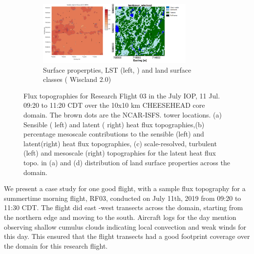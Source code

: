 \documentclass[draft]{agujournal2019}
\begin{document}
\begin{figure}[hbtp]
\begin{subfigure}{\textwidth}
     \end{subfigure}
     \begin{subfigure}{\textwidth}
         \includegraphics[width=0.85\textwidth]{topo_LST_landcover.png}
         \caption{Surface properpties, LST (left, \cite{desai_multisensor_2021}) and land surface classes ( Wiscland 2.0) }
         \label{fig:topo_LST_land}
     \end{subfigure}
        \caption{Flux topographies for Research Flight 03 in the July IOP, 11 Jul. 09:20 to 11:20 CDT over the 10x10 km CHEESEHEAD core domain. The brown dots are the NCAR-ISFS. tower locations. (a) Sensible ( left) and latent ( right) heat flux topographies,(b) percentage mesoscale contributions to the sensible (left) and latent(right) heat flux topographies, (c) scale-resolved, turbulent (left) and mesoscale (right) topographies for the latent heat flux topo. in (a) and (d) distribution of land surface properties across the domain. }
        \label{fig:topo}
 \end{figure}
 
We present a case study for one good flight, with a sample flux topography for a summertime morning flight, RF03, conducted on July 11th, 2019 from 09:20 to 11:30 CDT. The flight did east -west transects across the domain, starting from the northern edge and moving to the south.  Aircraft logs for the day mention observing shallow cumulus clouds indicating local convection and weak winds for this day. This ensured that the flight transects had a good footprint coverage over the domain for this research flight. 
\end{document}

